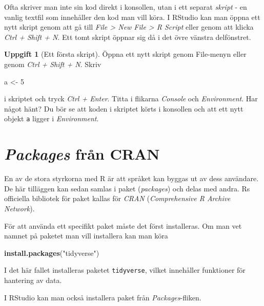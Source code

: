 \documentclass[
]{book}
\newenvironment{Shaded}{\begin{snugshade}}{\end{snugshade}}
\newcommand{\DecValTok}[1]{\textcolor[rgb]{0.00,0.00,0.81}{#1}}
\newcommand{\FunctionTok}[1]{\textcolor[rgb]{0.13,0.29,0.53}{\textbf{#1}}}
\newcommand{\NormalTok}[1]{#1}
\newcommand{\OtherTok}[1]{\textcolor[rgb]{0.56,0.35,0.01}{#1}}
\newcommand{\StringTok}[1]{\textcolor[rgb]{0.31,0.60,0.02}{#1}}
\theoremstyle{definition}
\theoremstyle{definition}
\theoremstyle{definition}
\newtheorem{exercise}{Uppgift}[chapter]
\theoremstyle{definition}
\theoremstyle{remark}
\begin{document}
Ofta skriver man inte sin kod direkt i konsollen, utan i ett separat \emph{skript} - en vanlig textfil som innehåller den kod man vill köra. I RStudio kan man öppna ett nytt skript genom att gå till \emph{File \textgreater{} New File \textgreater{} R Script} eller genom att klicka \emph{Ctrl + Shift + N}. Ett tomt skript öppnar sig då i det övre vänstra delfönstret.

\begin{exercise}[Ett första skript]
Öppna ett nytt skript genom File-menyn eller genom \emph{Ctrl + Shift + N}.
Skriv

\begin{Shaded}
\begin{Highlighting}[]
\NormalTok{a }\OtherTok{\textless{}{-}} \DecValTok{5}
\end{Highlighting}
\end{Shaded}

i skriptet och tryck \emph{Ctrl + Enter}. Titta i flikarna \emph{Console} och \emph{Environment}. Har något hänt? Du bör se att koden i skriptet körts i konsollen och att ett nytt objekt \texttt{a} ligger i \emph{Environment}.
\end{exercise}

\hypertarget{packages-fruxe5n-cran}{%
\section{\texorpdfstring{\emph{Packages} från CRAN}{Packages från CRAN}}\label{packages-fruxe5n-cran}}

En av de stora styrkorna med R är att språket kan byggas ut av dess användare. De här tilläggen kan sedan samlas i paket (\emph{packages}) och delas med andra. Rs officiella bibliotek för paket kallas för \emph{CRAN} (\emph{Comprehensive R Archive Network}).

För att använda ett specifikt paket måste det först installeras. Om man vet namnet på paketet man vill installera kan man köra

\begin{Shaded}
\begin{Highlighting}[]
\FunctionTok{install.packages}\NormalTok{(}\StringTok{"tidyverse"}\NormalTok{)}
\end{Highlighting}
\end{Shaded}

I det här fallet installeras paketet \texttt{tidyverse}, vilket innehåller funktioner för hantering av data.

I RStudio kan man också installera paket från \emph{Packages}-fliken.
\end{document}

